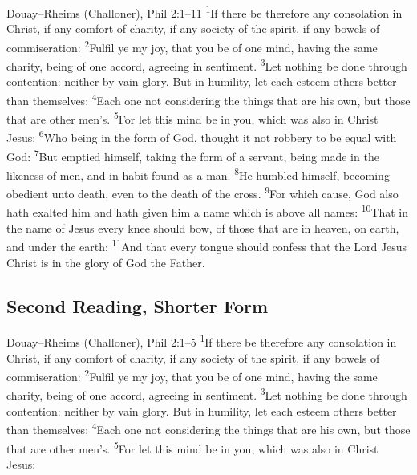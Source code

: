 \begin{englishwitness}{Douay--Rheims (Challoner), Phil 2:1--11}
\textsuperscript{1}If there be therefore any consolation in Christ, if any
comfort of charity, if any society of the spirit, if any bowels of
commiseration: \textsuperscript{2}Fulfil ye my joy, that you be of one mind,
having the same charity, being of one accord, agreeing in sentiment.
\textsuperscript{3}Let nothing be done through contention: neither by vain
glory. But in humility, let each esteem others better than themselves:
\textsuperscript{4}Each one not considering the things that are his own, but
those that are other men's. \textsuperscript{5}For let this mind be in you,
which was also in Christ Jesus: \textsuperscript{6}Who being in the form of
God, thought it not robbery to be equal with God: \textsuperscript{7}But
emptied himself, taking the form of a servant, being made in the likeness of
men, and in habit found as a man. \textsuperscript{8}He humbled himself,
becoming obedient unto death, even to the death of the cross.
\textsuperscript{9}For which cause, God also hath exalted him and hath given
him a name which is above all names: \textsuperscript{10}That in the name of
Jesus every knee should bow, of those that are in heaven, on earth, and under
the earth: \textsuperscript{11}And that every tongue should confess that the
Lord Jesus Christ is in the glory of God the Father.
\end{englishwitness}

\subsection{Second Reading, Shorter Form}
\label{proper-second-reading-short}


\begin{englishwitness}{Douay--Rheims (Challoner), Phil 2:1--5}
\textsuperscript{1}If there be therefore any consolation in Christ, if any
comfort of charity, if any society of the spirit, if any bowels of
commiseration: \textsuperscript{2}Fulfil ye my joy, that you be of one mind,
having the same charity, being of one accord, agreeing in sentiment.
\textsuperscript{3}Let nothing be done through contention: neither by vain
glory. But in humility, let each esteem others better than themselves:
\textsuperscript{4}Each one not considering the things that are his own, but
those that are other men's. \textsuperscript{5}For let this mind be in you,
which was also in Christ Jesus:
\end{englishwitness}

